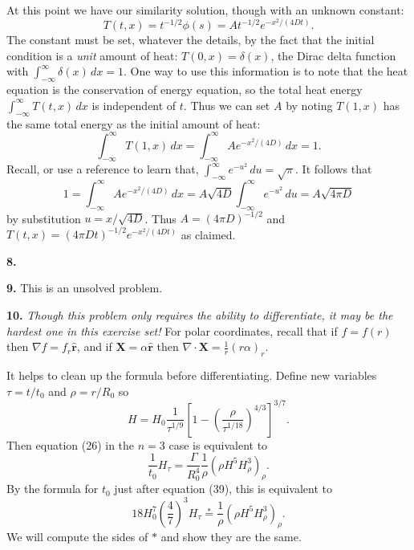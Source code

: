 \documentclass[10pt]{amsart}
\newcommand{\mfile}[1]{
\begin{quote}
\bigskip
\VerbatimInput[frame=single,label=\fbox{\normalsize \textsl{\,#1\,}},fontfamily=courier,fontsize=\footnotesize]{#1}
\end{quote}
}
\newcommand{\Div}{\nabla\cdot}
\newcommand{\grad}{\nabla}
\newcommand{\prob}[1]{\bigskip\noindent\large\textbf{#1.}\normalsize }
\begin{document}
At this point we have our similarity solution, though with an unknown constant:
    $$T(t,x) = t^{-1/2} \phi(s) = A t^{-1/2} e^{- x^2/(4Dt)}.$$
The constant must be set, whatever the details, by the fact that the initial condition is a \emph{unit} amount of heat: $T(0,x) = \delta(x)$, the Dirac delta function with $\int_{-\infty}^\infty \delta(x)\,dx = 1$.  One way to use this information is to note that the heat equation is the conservation of energy equation, so the total heat energy $\int_{-\infty}^\infty T(t,x)\,dx$ is independent of $t$.  Thus we can set $A$ by noting $T(1,x)$ has the same total energy as the initial amount of heat:
    $$\int_{-\infty}^\infty T(1,x)\,dx = \int_{-\infty}^\infty A e^{- x^2/(4D)}\,dx = 1.$$
Recall, or use a reference to learn that, $\int_{-\infty}^\infty e^{- u^2}\,du = \sqrt{\pi}$.  It follows that
    $$1 = \int_{-\infty}^\infty A e^{- x^2/(4D)}\,dx = A \sqrt{4D} \int_{-\infty}^\infty e^{- u^2}\,du = A \sqrt{4\pi D}$$
by substitution $u=x/\sqrt{4D}$.  Thus $A = (4\pi D)^{-1/2}$ and $T(t,x) = (4\pi D t)^{-1/2} e^{- x^2/(4Dt)}$ as claimed.

\prob{8}

\mfile{verifyheat.m}

\prob{9}  This is an unsolved problem.

\prob{10}  \emph{Though this problem only requires the ability to differentiate, it may be the hardest one in this exercise set!}  For polar coordinates, recall that if $f=f(r)$ then $\grad f = f_r \hat{\mathbf{r}}$, and if $\mathbf{X}=\alpha \hat{\mathbf{r}}$ then $\Div \mathbf{X} = \frac{1}{r} \left(r \alpha\right)_r$.

It helps to clean up the formula before differentiating.  Define new variables $\tau = t/t_0$ and $\rho = r/R_0$ so
    $$H = H_0 \frac{1}{\tau^{1/9}} \left[1 - \left( \frac{\rho}{\tau^{1/18}} \right)^{4/3}\right]^{3/7}.$$
Then equation (26) in the $n=3$ case is equivalent to
    $$\frac{1}{t_0} H_\tau = \frac{\Gamma}{R_0^4} \frac{1}{\rho} \left(\rho H^5 H_\rho^3\right)_\rho.$$
By the formula for $t_0$ just after equation (39), this is equivalent to
    $$18 H_0^7 \left(\frac{4}{7}\right)^3 H_\tau \stackrel{\ast}{=} \frac{1}{\rho} \left(\rho H^5 H_\rho^3\right)_\rho.$$
We will compute the sides of $\ast$ and show they are the same.
\end{document}
